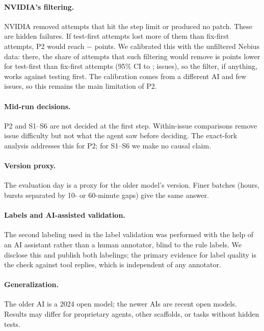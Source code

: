 \documentclass[sigconf,review=false,anonymous=false]{acmart}
\begin{document}
\paragraph{NVIDIA's filtering.} NVIDIA removed attempts that hit the step limit or produced no patch. These are hidden failures. If test-first attempts lost \TipPoint{} more of them than fix-first attempts, P2 would reach $-$\Margin{} points. We calibrated this with the unfiltered Nebius data: there, the share of attempts that such filtering would remove is \Calib{} points lower for test-first than fix-first attempts (95\% CI \CalibLo{} to \CalibHi{}; \CalibIssues{} issues), so the filter, if anything, works against testing first. The calibration comes from a different AI and few issues, so this remains the main limitation of P2.

\paragraph{Mid-run decisions.} P2 and S1--S6 are not decided at the first step. Within-issue comparisons remove issue difficulty but not what the agent saw before deciding. The exact-fork analysis addresses this for P2; for S1--S6 we make no causal claim.

\paragraph{Version proxy.} The evaluation day is a proxy for the older model's version. Finer batches (hours, bursts separated by 10- or 60-minute gaps) give the same answer.

\paragraph{Labels and AI-assisted validation.} The second labeling used in the label validation was performed with the help of an AI assistant rather than a human annotator, blind to the rule labels. We disclose this and publish both labelings; the primary evidence for label quality is the check against tool replies, which is independent of any annotator.

\paragraph{Generalization.} The older AI is a 2024 open model; the newer AIs are recent open models. Results may differ for proprietary agents, other scaffolds, or tasks without hidden tests.
\end{document}
